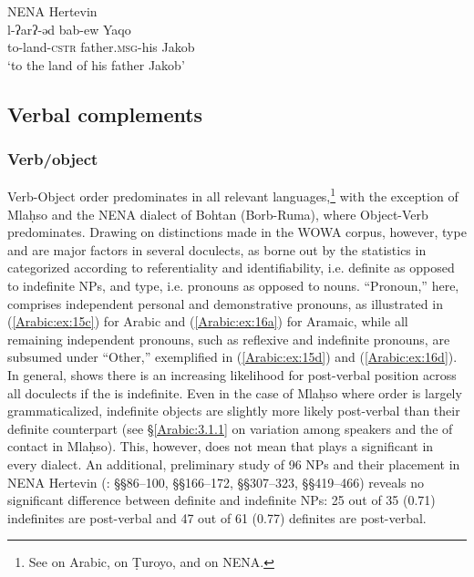 \documentclass[output=paper,colorlinks,citecolor=brown,draftmode]{langscibook}
\begin{document}
\ea\label{Arabic:ex:14}
NENA Hertevin \citep[156.§583]{Jastrow1988NAHertevin} \\
\gll l-ʔarʔ-əd bab-ew Yaqo \\
     to-land\textsc{-cstr} father\textsc{.msg-}his Jakob \\
\glt `to the land of his father Jakob'
\z

\subsection{Verbal complements}
\subsubsection{Verb/object}

Verb-Object order predominates in all relevant languages,\footnote{See \citet{Dahlgren1998WOA} on Arabic, \citet[289--290]{Waltisberg2016STuroyo} on Ṭuroyo, and \citet{NoorlanderMolin2022WordOrder} on NENA.} with the exception of Mlaḥso and the NENA dialect of Bohtan (Borb-Ruma), where Object-Verb predominates.  Drawing on distinctions made in the WOWA corpus, however,  type and  are major factors in several  doculects, as borne out by the statistics in  categorized according to referentiality and identifiability, i.e. definite as opposed to indefinite NPs, and  type, i.e. pronouns as opposed to nouns.  ``Pronoun,'' here, comprises independent personal and demonstrative pronouns, as illustrated in (\ref{Arabic:ex:15c}) for Arabic and (\ref{Arabic:ex:16a}) for Aramaic, while all remaining independent pronouns, such as reflexive and indefinite pronouns, are subsumed under ``Other,'' exemplified in (\ref{Arabic:ex:15d}) and (\ref{Arabic:ex:16d}). In general,  shows there is an increasing likelihood for post-verbal position across all doculects if the  is indefinite. Even in the case of Mlaḥso where  order is largely grammaticalized, indefinite objects are slightly more likely post-verbal than their definite counterpart (see §\ref{Arabic:3.1.1} on variation among speakers and the  of contact in Mlaḥso). This, however, does not mean that  plays a significant  in every dialect. An additional, preliminary study of 96  NPs and their placement in NENA Hertevin (\cite{Jastrow1988NAHertevin}: §§86--100, §§166--172, §§307--323, §§419--466) reveals no significant difference between definite and indefinite  NPs: 25 out of 35 (0.71) indefinites are post-verbal and 47 out of 61 (0.77) definites are post-verbal.
\end{document}
